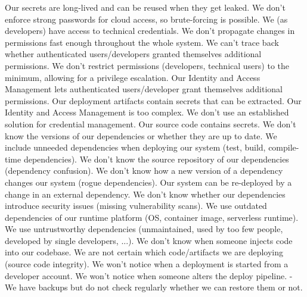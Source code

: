 %

% 
 {Our secrets are long-lived and can be reused when they get leaked.}
 {We don't enforce strong passwords for cloud access, so brute-forcing is possible.}
 {We (as developers) have access to technical credentials.}
 {We don't propagate changes in permissions fast enough throughout the whole system.}
 {We can't trace back whether authenticated users/developers granted themselves additional permissions.}
 {We don't restrict permissions (developers, technical users) to the minimum, allowing for a privilege escalation.}
 {Our Identity and Access Management lets authenticated users/developer grant themselves additional permissions.}
 {Our deployment artifacts contain secrets that can be extracted.}
 {Our Identity and Access Management is too complex.}
 {We don't use an established solution for credential management.}
 {Our source code contains secrets.}
%
 {We don't know the versions of our dependencies or whether they are up to date.}
 {We include unneeded dependencies when deploying our system (test, build, compile-time dependencies).}
 {We don't know the source repository of our dependencies (dependency confusion).}
 {We don't know how a new version of a dependency changes our system (rogue dependencies).}
 {Our system can be re-deployed by a change in an external dependency.}
 {We don't know whether our dependencies introduce security issues (missing vulnerability scans).}
 {We use outdated dependencies of our runtime platform (OS, container image, serverless runtime).}
 {We use untrustworthy dependencies (unmaintained, used by too few people, developed by single developers, ...).}
 {We don't know when someone injects code into our codebase.}
 {We are not certain which code/artifacts we are deploying (source code integrity).}
 {We won't notice when a deployment is started from a developer account.}
 {We won't notice when someone alters the deploy pipeline.}
%
 {-}
 {We have backups but do not check regularly whether we can restore them or not.}
